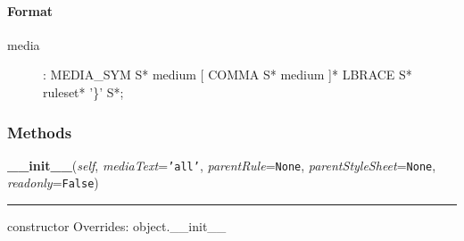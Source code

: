 
\hypertarget{format}{}
\paragraph*{Format}
\label{format}
\begin{description}
\item[{media}] \leavevmode 
: MEDIA{\_}SYM S* medium {[} COMMA S* medium {]}* LBRACE S* ruleset* '{\}}' S*;

\end{description}


  \subsubsection{Methods}

    \vspace{0.5ex}

\hspace{.8\funcindent}\begin{boxedminipage}{\funcwidth}

    \raggedright \textbf{\_\_init\_\_}(\textit{self}, \textit{mediaText}={\tt \texttt{'}\texttt{all}\texttt{'}}, \textit{parentRule}={\tt None}, \textit{parentStyleSheet}={\tt None}, \textit{readonly}={\tt False})

    \vspace{-1.5ex}

    \rule{\textwidth}{0.5\fboxrule}
\setlength{\parskip}{2ex}

constructor
\setlength{\parskip}{1ex}
      Overrides: object.\_\_init\_\_

    \end{boxedminipage}

    \label{cssutils:css:cssmediarule:CSSMediaRule:__iter__}

    \vspace{0.5ex}

